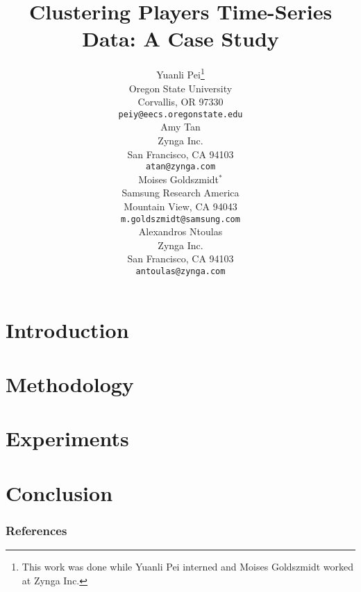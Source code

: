 \documentclass{article} %
\title{Clustering Players Time-Series Data: A Case Study}
\author{
Yuanli Pei\thanks{This work was done while Yuanli Pei interned and Moises Goldszmidt worked at Zynga Inc.} \\
Oregon State University\\ 
Corvallis, OR 97330\\
\texttt{peiy@eecs.oregonstate.edu} \\
\And
Amy Tan\\
Zynga Inc.\\
San Francisco, CA 94103\\
\texttt{atan@zynga.com} \\
\AND
Moises Goldszmidt$^\ast$ \\
Samsung Research America\\
Mountain View, CA 94043\\
\texttt{m.goldszmidt@samsung.com} \\
\And
Alexandros Ntoulas\\
Zynga Inc.\\
San Francisco, CA 94103\\
\texttt{antoulas@zynga.com} 
}
\begin{document}
\maketitle

\begin{abstract}
%

\end{abstract}


\section{Introduction}
%


%

\section{Methodology}


\section{Experiments}


\section{Conclusion}




\subsubsection*{References}
\small{
    {}
    
}



\end{document}
